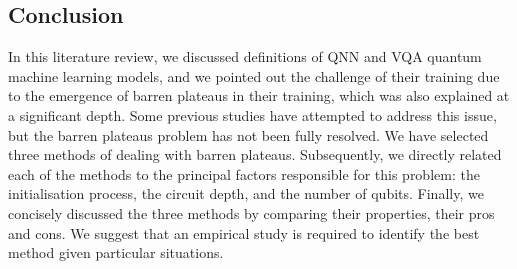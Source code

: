 \subsection{Conclusion}
In this literature review, we discussed definitions of QNN and VQA quantum machine learning models, and we pointed out the challenge of their training due to the emergence of barren plateaus in their training, which was also explained at a significant depth. 
Some previous studies have attempted to address this issue, but the barren plateaus problem has not been fully resolved.
We have selected three methods of dealing with barren plateaus. 
Subsequently, we directly related each of the methods to the principal factors responsible for this problem: the initialisation process, the circuit depth, and the number of qubits.
Finally, we concisely discussed the three methods by comparing their properties, their pros and cons.
We suggest that an empirical study is required to identify the best method given particular situations.